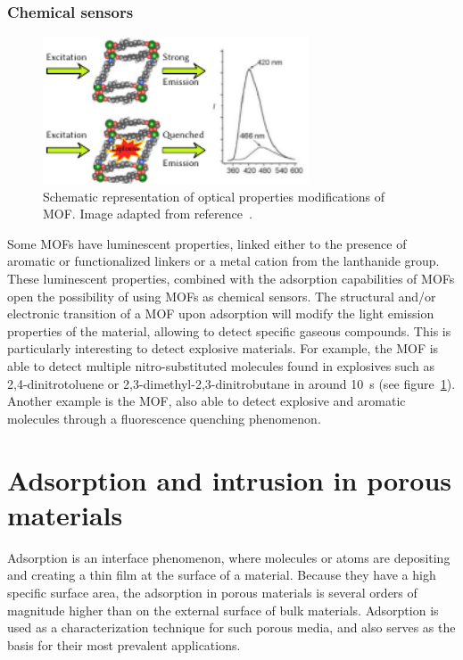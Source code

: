 \documentclass[thesis]{subfiles}
\begin{document}
\subsubsection{Chemical sensors}

\begin{figure}[ht]
    \centering
    \includegraphics[width=0.7\textwidth]{figures/cited/chemical-sensor}
    \caption{Schematic representation of optical properties modifications of
     MOF. Image adapted from reference~\cite{Lan2009}.}
    \label{fig:chemical-sensor}
\end{figure}

Some MOFs have luminescent properties, linked either to the presence of aromatic
or functionalized linkers or a metal cation from the lanthanide group. These
luminescent properties, combined with the adsorption capabilities of MOFs open
the possibility of using MOFs as chemical sensors. The structural and/or
electronic transition of a MOF upon adsorption will modify the light emission
properties of the material, allowing to detect specific gaseous compounds. This
is particularly interesting to detect explosive materials. For example, the
 MOF is able to detect multiple nitro-substituted
molecules found in explosives such as 2,4-dinitrotoluene or
2,3-dimethyl-2,3-dinitrobutane in around \SI{10}{s}\cite{Lan2009} (see
figure~\ref{fig:chemical-sensor}). Another example is the 
MOF, also able to detect explosive and aromatic molecules through a fluorescence
quenching phenomenon\cite{Pramanik2011}.

\newpage
\section{Adsorption and intrusion in porous materials}

Adsorption is an interface phenomenon, where molecules or atoms are depositing
and creating a thin film at the surface of a material. Because they have a high
specific surface area, the adsorption in porous materials is several orders of
magnitude higher than on the external surface of bulk materials. Adsorption is
used as a characterization technique for such porous media, and also serves as
the basis for their most prevalent applications.
\end{document}
